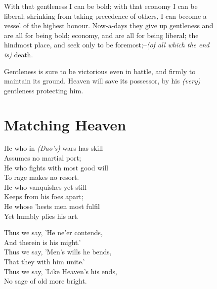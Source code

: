     With that gentleness I can be bold; with that economy I can be\\
    liberal; shrinking from taking precedence of others, I can become a\\
    vessel of the highest honour. Now-a-days they give up gentleness and\\
    are all for being bold; economy, and are all for being liberal; the\\
    hindmost place, and seek only to be foremost;--\textit{(of all which the end\\
    is)} death.\vspace{\baselineskip}
    
    Gentleness is sure to be victorious even in battle, and firmly to\\
    maintain its ground. Heaven will save its possessor, by his \textit{(very)}\\
    gentleness protecting him.\vspace{\baselineskip}\newpage{}
\section*{Matching Heaven}
    He who in \textit{(Dao's)} wars has skill\\
    Assumes no martial port;\\
    He who fights with most good will\\
    To rage makes no resort.\\
    He who vanquishes yet still\\
    Keeps from his foes apart;\\
    He whose 'hests men most fulfil\\
    Yet humbly plies his art.\vspace{\baselineskip}
    
    Thus we say, 'He ne'er contends,\\
    And therein is his might.'\\
    Thus we say, 'Men's wills he bends,\\
    That they with him unite.'\\
    Thus we say, 'Like Heaven's his ends,\\
    No sage of old more bright.\vspace{\baselineskip}
